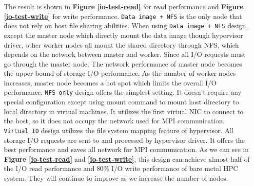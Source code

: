 The result is shown in \textbf{Figure \ref{io-test-read}} for read performance and \textbf{Figure \ref{io-test-write}} for write performance. \texttt{Data image + NFS} is the only node that does not rely on host file sharing abilities. When using \texttt{Data image + NFS} design, except the master node which directly mount the data image though hypervisor driver, other worker nodes all mount the shared directory through NFS, which depends on the network between master and worker. Since all I/O requests must go through the master node. The network performance of master node becomes the upper bound of storage I/O performance. As the number of worker nodes increases, master node becomes a hot spot which limits the overall I/O performance.  \texttt{NFS only} design offers the simplest setting. It doesn't require any special configuration except using mount command to mount host directory to local directory in virtual machines. It utilizes the first virtual NIC to connect to the host, so it does not occupy the network used for MPI communication.  \texttt{Virtual IO} design utilizes the file system mapping feature of hypervisor. All storage I/O requests are sent to and processed by hypervisor driver. It offers the best performance and saves all network for MPI communication. As we can see in \textbf{Figure \ref{io-test-read}} and \textbf{\ref{io-test-write}}, this design can achieve almost half of the I/O read performance and 80\% I/O write performance of bare metal HPC system. They will continue to improve as we increase the number of nodes.


